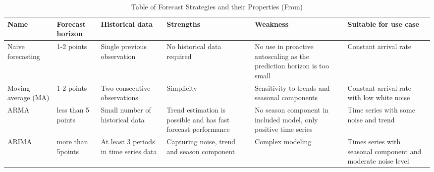\begin{flushleft}
  \begin{table}
    \begin{tabular}{ | L{2cm} | L{2cm} | L{2cm} | L{2cm} | L{2cm} | L{2cm} |}
      \hline
      Name & Forecast horizon & Historical data & Strengths & Weakness & Suitable for use case \\ \hline
      Naive forecasting  & 1-2 points & Single previous observation & No historical data required & No use in proactive autoscaling as the prediction horizon is too small & Constant arrival rate \\ \hline
      Moving average (MA) & 1-2 points & Two consecutive observations & Simplicity & Sensitivity to trends and seasonal components & Constant arrival rate with low white noise \\ \hline
      ARMA & less than 5 points & Small number of historical data & Trend estimation is possible and has fast forecast performance & No season component in included model, only positive time series & Time series with some noise and trend\\ \hline
      ARIMA\cite{box2015time} & more than 5points & At least 3 periods in time series data & Capturing noise, trend and season component & Complex modeling & Times series with seasonal component and moderate noise level\\ \hline
    \end{tabular}
    \caption{Table of Forecast Strategies and their Properties (From\cite{herbst2012workload})}
    \label{table:tssurvey}
\end{table}
\end{flushleft}

